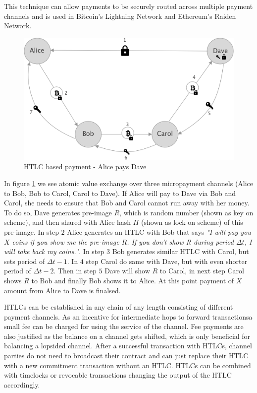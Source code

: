\documentclass[a4paper,12pt]{article}
\begin{document}
This technique can allow payments to be securely routed across multiple payment 
channels and is used in Bitcoin's Lightning Network and Ethereum's Raiden 
Network.

\begin{figure}[H]
    \centering
    \includegraphics[scale=0.5]{img/htlc}
    \caption{HTLC based payment - Alice pays Dave}
    \label{img:htlc}
\end{figure}

In figure \ref{img:htlc} we see atomic value exchange over three micropayment 
channels (Alice to Bob, Bob to Carol, Carol to Dave). If Alice will pay to Dave
via Bob and Carol, she needs to ensure that Bob and Carol cannot run away with 
her money. To do so, Dave generates pre-image $R$, which is random number (shown 
as key on scheme), and then shared with Alice hash $H$ (shown as lock on scheme) 
of this pre-image. In step $2$ Alice generates an HTLC with Bob that says 
\textit{"I will pay you $X$ coins if you show me the pre-image $R$. If you don't 
show R during period $\Delta t$, I will take back my coins."}. In step $3$ Bob 
generates similar HTLC with Carol, but sets period of $\Delta t - 1$. In $4$ step 
Carol do same with Dave, but with even shorter period of $\Delta t - 2$. Then in 
step $5$ Dave will show $R$ to Carol, in next step Carol shows $R$ to Bob and 
finally Bob shows it to Alice. At this point payment of $X$ amount from Alice to 
Dave is finalsed.

HTLCs can be established in any chain of any length consisting of different 
payment channels. As an incentive for intermediate hops to forward transactionsa 
small fee can be charged for using the service of the channel. Fee payments are 
also justified as the balance on a channel gets shifted, which is only beneficial 
for balancing a lopsided channel. After a successful transaction with HTLCs, 
channel parties do not need to broadcast their contract and can just replace their
HTLC with a new commitment transaction without an HTLC. HTLCs can be combined with 
timelocks or revocable transactions changing the output of the HTLC accordingly.\\
\end{document}
